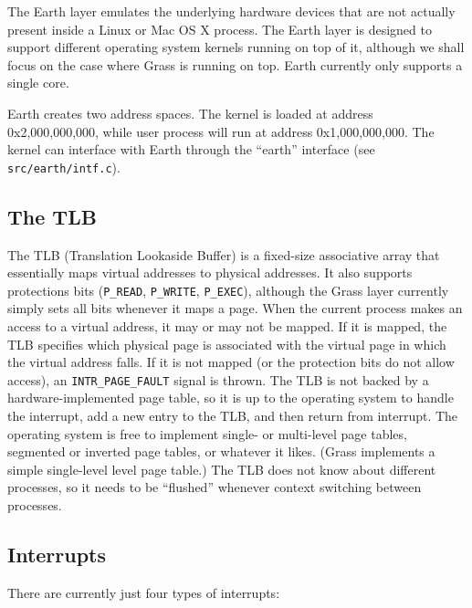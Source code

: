 \documentclass{article}
\begin{document}
The Earth layer emulates the underlying hardware devices that are not
actually present inside a Linux or Mac OS X process.  The Earth layer
is designed to support different operating system kernels running on
top of it, although we shall focus on the case where Grass is running
on top.  Earth currently only supports a single core.

Earth creates two address spaces.  The kernel is loaded at address
0x2,000,000,000, while user process will run at address
0x1,000,000,000.  The kernel can interface with Earth through
the ``earth'' interface (see \texttt{src/earth/intf.c}).

\subsection{The TLB}

The TLB (Translation Lookaside Buffer) is a fixed-size associative
array that essentially maps virtual addresses to physical addresses.
It also supports protections bits (\texttt{P\_READ}, \texttt{P\_WRITE},
\texttt{P\_EXEC}), although the Grass layer currently simply sets all
bits whenever it maps a page.
When the current process makes an access to a virtual address, it may
or may not be mapped.
If it is mapped, the TLB specifies which physical page is associated
with the virtual page in which the virtual address falls.
If it is not mapped (or the protection bits do not allow access),
an \texttt{INTR\_PAGE\_FAULT} signal is thrown.
The TLB is not backed by a hardware-implemented page table, so it is
up to the operating system to handle the interrupt, add a new entry
to the TLB, and then return from interrupt.
The operating system is free to implement single- or multi-level page
tables, segmented or inverted page tables, or whatever it likes.
(Grass implements a simple single-level level page table.)
The TLB does not know about different processes, so it needs to be
``flushed'' whenever context switching between processes.

\subsection{Interrupts}

There are currently just four types of interrupts:
\end{document}
